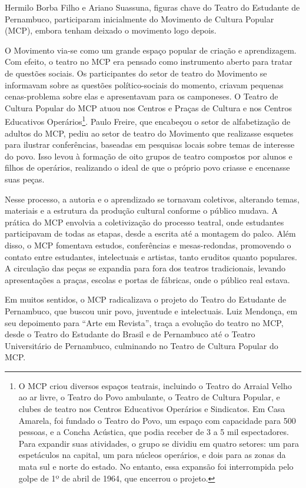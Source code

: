 Hermilo Borba Filho e Ariano Suassuna, figuras chave do Teatro do
Estudante de Pernambuco, participaram inicialmente do Movimento de
Cultura Popular (MCP), embora tenham deixado o movimento logo depois.

O Movimento via-se como um grande espaço popular de criação e
aprendizagem. Com efeito, o teatro no MCP era pensado como instrumento
aberto para tratar de questões sociais. Os participantes do setor de
teatro do Movimento se informavam sobre as questões político-sociais do
momento, criavam pequenas cenas-problema sobre elas e apresentavam para
os camponeses. O Teatro de Cultura Popular do MCP atuou nos Centros e
Praças de Cultura e nos Centros Educativos Operários\footnote{O MCP
  criou diversos espaços teatrais, incluindo o Teatro do Arraial Velho
  ao ar livre, o Teatro do Povo ambulante, o Teatro de Cultura Popular,
  e clubes de teatro nos Centros Educativos Operários e Sindicatos. Em
  Casa Amarela, foi fundado o Teatro do Povo, um espaço com capacidade
  para 500 pessoas, e a Concha Acústica, que podia receber de 3 a 5 mil
  espectadores. Para expandir suas atividades, o grupo se dividiu em
  quatro setores: um para espetáculos na capital, um para núcleos
  operários, e dois para as zonas da mata sul e norte do estado. No
  entanto, essa expansão foi interrompida pelo golpe de 1º de abril de
  1964, que encerrou o projeto.}. Paulo Freire, que encabeçou o setor de
alfabetização de adultos do MCP, pediu ao setor de teatro do Movimento
que realizasse esquetes para ilustrar conferências, baseadas em
pesquisas locais sobre temas de interesse do povo. Isso levou à formação
de oito grupos de teatro compostos por alunos e filhos de operários,
realizando o ideal de que o próprio povo criasse e encenasse suas peças.

Nesse processo, a autoria e o aprendizado se tornavam coletivos,
alterando temas, materiais e a estrutura da produção cultural conforme o
público mudava. A prática do MCP envolvia a coletivização do processo
teatral, onde estudantes participavam de todas as etapas, desde a
escrita até a montagem do palco. Além disso, o MCP fomentava estudos,
conferências e mesas-redondas, promovendo o contato entre estudantes,
intelectuais e artistas, tanto eruditos quanto populares. A circulação
das peças se expandia para fora dos teatros tradicionais, levando
apresentações a praças, escolas e portas de fábricas, onde o público
real estava.

Em muitos sentidos, o MCP radicalizava o projeto do Teatro do Estudante
de Pernambuco, que buscou unir povo, juventude e intelectuais. Luiz
Mendonça, em seu depoimento para “Arte em Revista”, traça a evolução do
teatro no MCP, desde o Teatro do Estudante do Brasil e de Pernambuco até
o Teatro Universitário de Pernambuco, culminando no Teatro de Cultura
Popular do MCP.

